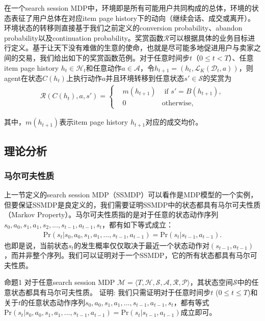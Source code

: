 在一个search session MDP中，环境即是所有可能用户共同构成的总体，环境的状态表征了用户总体在对应item page history下的动向（继续会话、成交或离开）。环境状态的转移则直接基于我们之前定义的conversion probability、abandon probability以及continuation probability。奖赏函数$\mathcal{R}$可以根据具体的业务目标进行定义。基于让天下没有难做的生意的使命，也就是尽可能多地促进用户与卖家之间的交易，我们给出如下的奖赏函数范例。对于任意时间步$t$（$0 \leq t < T$）、任意item page history $h_t \in \mathcal{H}_t$和任意动作$a \in \mathcal{A}$，令$h_{t+1} = (h_t, \mathcal{L}_K(\mathcal{D}_t, a))$，则agent在状态$C(h_t)$上执行动作$a$并且环境转移到任意状态$s' \in \mathcal{S}$的奖赏为
\begin{align}
 \mathcal{R}(C(h_t), a, s') = \left\{
\begin{aligned}
&m(h_{t+1}) &\text{ if } s' = B(h_{t+1}), \\
&0 &\text{otherwise,} \quad\quad
\end{aligned}
\right.  
\end{align}

其中，$m(h_{t+1})$表示item page history $h_{t+1}$对应的成交均价。

\subsection{理论分析}
\subsubsection{马尔可夫性质}
上一节定义的search session MDP（SSMDP）可以看作是MDP模型的一个实例，但要保证SSMDP是良定义的，我们需要证明SSMDP中的状态都具有马尔可夫性质（Markov Property）。马尔可夫性质指的是对于任意的状态动作序列$s_0, a_0, s_1, a_1, s_2, ..., s_{t-1}, a_{t-1}, s_t$，都有如下等式成立：
\begin{align}
\text{Pr}(s_t | s_0, a_0, s_1, a_1, ..., s_{t-1}, a_{t-1}) = \text{Pr}(s_t | s_{t-1}, a_{t-1}).
\end{align}
也即是说，当前状态$s_t$的发生概率仅仅取决于最近一个状态动作对$(s_{t-1}, a_{t-1})$，而并非整个序列。我们可以证明对于一个SSMDP，它的所有状态都具有马尔可夫性质。

命题1 
对于任意search session MDP $\mathcal{M} = \langle T, \mathcal{H}, \mathcal{S}, \mathcal{A}, \mathcal{R}, \mathcal{P} \rangle$，其状态空间$\mathcal{S}$中的任意状态都具有马尔可夫性质。
证明:
我们只需证明对于任意时间步$t$ ($0 \leq t \leq T$)和关于$t$的任意状态动作序列$s_0, a_0, s_1, a_1, ..., s_{t-1}, a_{t-1}, s_t$，都有等式$\text{Pr}(s_t | s_0, a_0, s_1, a_1, ..., s_{t-1}, a_{t-1}) = \text{Pr}(s_t | s_{t-1}, a_{t-1})$成立即可。

